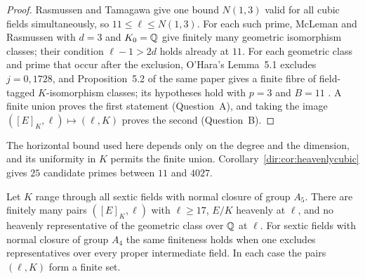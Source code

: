\begin{proof}
Rasmussen and Tamagawa
\cite[Conjecture~2 and Proposition~7.5]{RasmussenTamagawa2017Arithmetic} give one bound
$N(1,3)$ valid for all cubic fields simultaneously, so $11\le\ell\le N(1,3)$. For each
such prime, McLeman and Rasmussen
\cite[Theorem~1.2, equivalently Theorem~3.1]{McLemanRasmussen2026Heavenly} with $d=3$
and $K_0=\mathbb{Q}$ give finitely many geometric isomorphism classes; their condition
$\ell-1>2d$ holds already at $11$. For each geometric class and prime that occur after
the exclusion, O'Hara's Lemma~5.1 excludes $j=0,1728$, and Proposition~5.2 of the same
paper gives a finite fibre of field-tagged $K$-isomorphism classes; its hypotheses hold with $p=3$
and $B=11$ \cite{OHara2026Heavenly}. A finite union proves the first statement
(Question~A), and taking the image $([E]_K,\ell)\mapsto(\ell,K)$ proves the second
(Question~B).
\end{proof}

The horizontal bound used here depends only on the degree and the dimension, and its
uniformity in $K$ permits the finite union. Corollary~\ref{dir:cor:heavenlycubic} gives $25$
candidate primes between $11$ and $4027$.

\begin{theorem}\label{dir:thm:heavenlysexticfinite}
Let $K$ range through all sextic fields with normal closure of group $A_5$. There are
finitely many pairs $([E]_K,\ell)$ with $\ell\ge17$, $E/K$ heavenly at $\ell$, and no
heavenly representative of the geometric class over $\mathbb{Q}$ at $\ell$. For sextic fields
with normal closure of group $A_4$ the same finiteness holds when one excludes
representatives over every proper intermediate field. In each case the pairs
$(\ell,K)$ form a finite set.
\end{theorem}

